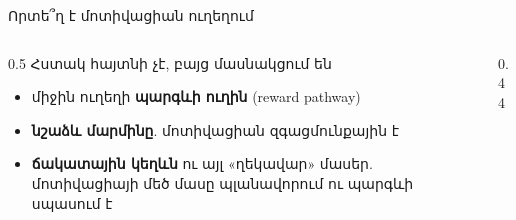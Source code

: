 \begin{frame}{Որտե՞ղ է մոտիվացիան ուղեղում}
  \begin{columns}[c]
    \begin{column}{0.5\textwidth}
      {\small Հստակ հայտնի չէ, բայց մասնակցում են}\par\smallskip
      \begin{itemize}
        \item միջին ուղեղի \textbf{պարգևի ուղին} (reward pathway)
        \item \textbf{նշաձև մարմինը}. մոտիվացիան զգացմունքային է
        \item \textbf{ճակատային կեղևն} ու այլ «ղեկավար» մասեր. մոտիվացիայի մեծ մասը պլանավորում ու պարգևի սպասում է
      \end{itemize}
    \end{column}
    \begin{column}{0.44\textwidth}
    \end{column}
  \end{columns}
\end{frame}

